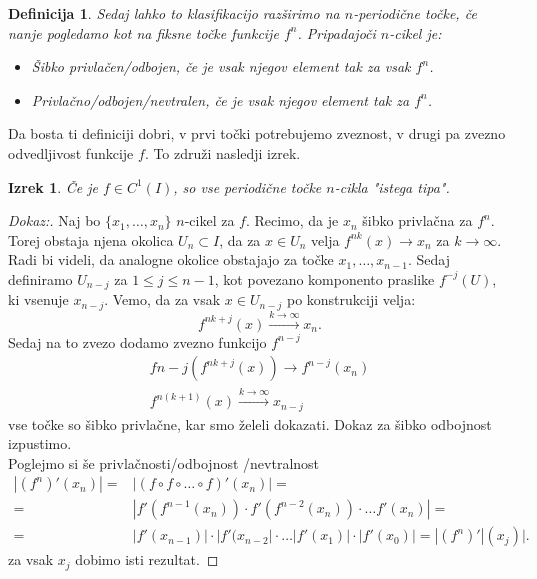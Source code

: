 \documentclass{article}
\newtheorem{definicija}{Definicija}
\newtheorem{izrek}{Izrek}
\begin{document}
\begin{definicija}
Sedaj lahko to klasifikacijo razširimo na $n$-periodične točke, če nanje pogledamo kot na fiksne točke funkcije $f^n$. Pripadajoči $n$-cikel je:
\begin{itemize}
\item Šibko privlačen\slash odbojen, če je vsak njegov element tak za vsak $f^n$.
\item Privlačno\slash odbojen\slash nevtralen, če je vsak njegov element tak za $f^n$. 
\end{itemize}
\end{definicija}
Da bosta ti definiciji dobri, v prvi točki potrebujemo zveznost, v drugi pa zvezno odvedljivost funkcije $f$. To združi nasledji izrek.
\begin{izrek}
Če je $f\in C^1(I)$, so vse periodične točke $n$-cikla "istega tipa".
\end{izrek}

\begin{proof}[Dokaz:]
Naj bo $\{x_1, \dots, x_n\}$ $n$-cikel za $f$. Recimo, da je $x_n$ šibko privlačna za $f^n$. Torej obstaja njena okolica $U_n \subset I$, da za $x\in U_n$ velja $f^{nk}(x) \rightarrow x_n$ za $k\rightarrow \infty$. Radi bi videli, da analogne okolice obstajajo za točke $x_1, \dots, x_{n-1}$. Sedaj definiramo $U_{n-j}$ za $1 \leq j \leq n-1$, kot povezano komponento praslike $f^{-j}(U)$, ki vsenuje $x_{n-j}$. Vemo, da za vsak $x\in U_{n-j}$ po konstrukciji velja:
$$
f^{nk + j}(x) \xrightarrow{k\rightarrow \infty} x_n.
$$
Sedaj na to zvezo dodamo zvezno funkcijo $f^{n-j}$
\begin{align*}
f{n-j}(f^{nk + j}(x)) \rightarrow f^{n-j}(x_n) \\ 
f^{n(k+1)}(x) \xrightarrow{k\rightarrow \infty} x_{n-j} 
\end{align*}
vse točke so šibko privlačne, kar smo želeli dokazati. Dokaz za šibko odbojnost izpustimo.\\[3mm]
Poglejmo si še privlačnosti\slash odbojnost \slash nevtralnost
\begin{align*}
|(f^n)'(x_n)| =& |(f \circ f \circ \dots \circ f)'(x_n)| = \\ 
=& |f'(f^{n-1}(x_n)) \cdot f'(f^{n-2}(x_n)) \cdot \dots f'(x_n)| = \\ 
=& |f'(x_{n-1})| \cdot |f'(x_{n-2}| \cdot \dots |f'(x_1)| \cdot |f'(x_0)| = |(f^n)'|(x_j)|.
\end{align*}
za vsak $x_j$ dobimo isti rezultat.
\end{proof}
\end{document}
